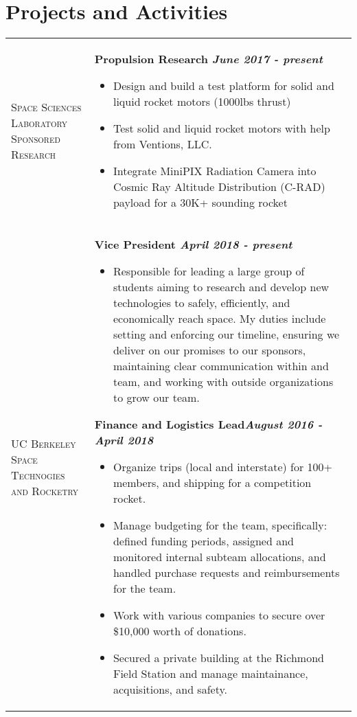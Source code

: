 \documentclass[letterpaper, 10pt]{article}
\begin{document}
\section{Projects and Activities}
\begin{flushleft}
  \begin{tabular}{>{\raggedright}p{1.3in} @{\hskip .2in} l}
      \textsc{Space Sciences Laboratory Sponsored Research}   & \parbox[t]{5.75in}{ \textbf{Propulsion Research \hfill\textit{June 2017 - present}}
      \begin{itemize}
      \item Design and build a test platform for solid and liquid rocket motors (1000lbs thrust)
      \item Test solid and liquid rocket motors with help from Ventions, LLC.
      \item Integrate MiniPIX Radiation Camera into Cosmic Ray Altitude Distribution (C-RAD) payload for a 30K+ sounding rocket
      \end{itemize}} \medskip \\

      \textsc{UC Berkeley Space Technogies and Rocketry}   & \parbox[t]{5.75in}{ \textbf{Vice President \hfill\textit{April 2018 - present}}
      \begin{itemize}
      \item Responsible for leading a large group of students aiming to research and develop new technologies to safely, efficiently, and economically reach space. My duties include setting and enforcing our timeline, ensuring we deliver on our promises to our sponsors, maintaining clear communication within and team, and working with outside organizations to grow our team.
      \end{itemize} \smallskip
      \textbf{Finance and Logistics Lead\hfill\textit{August 2016 - April 2018}}
      \begin{itemize}
      \item Organize trips (local and interstate) for 100+ members, and shipping for a competition rocket.
      \item Manage budgeting for the team, specifically: defined funding periods, assigned and monitored internal subteam allocations, and handled purchase requests and reimbursements for the team.
      \item Work with various companies to secure over \$10,000 worth of donations.
      \item Secured a private building at the Richmond Field Station and manage maintainance, acquisitions, and safety.
      \end{itemize}} \medskip \\


\end{tabular}
\end{flushleft}
\end{document}
